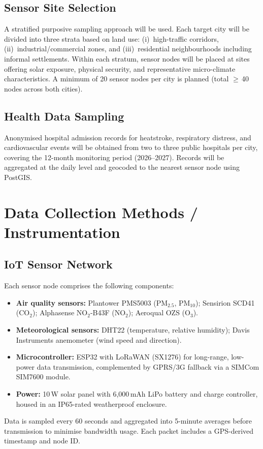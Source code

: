 \documentclass[12pt,a4paper]{report}
\begin{document}
\subsection{Sensor Site Selection}
A stratified purposive sampling approach will be used. Each target city will be divided into three strata based on land use: (i)~high-traffic corridors, (ii)~industrial/commercial zones, and (iii)~residential neighbourhoods including informal settlements. Within each stratum, sensor nodes will be placed at sites offering solar exposure, physical security, and representative micro-climate characteristics. A minimum of 20 sensor nodes per city is planned (total $\geq$\,40 nodes across both cities).

\subsection{Health Data Sampling}
Anonymised hospital admission records for heatstroke, respiratory distress, and cardiovascular events will be obtained from two to three public hospitals per city, covering the 12-month monitoring period (2026--2027). Records will be aggregated at the daily level and geocoded to the nearest sensor node using PostGIS.

\section{Data Collection Methods / Instrumentation}

\subsection{IoT Sensor Network}
Each sensor node comprises the following components:
\begin{itemize}[leftmargin=*, itemsep=4pt]
  \item \textbf{Air quality sensors:} Plantower PMS5003 (PM$_{2.5}$, PM$_{10}$); Sensirion SCD41 (CO$_2$); Alphasense NO$_2$-B43F (NO$_2$); Aeroqual OZS (O$_3$).
  \item \textbf{Meteorological sensors:} DHT22 (temperature, relative humidity); Davis Instruments anemometer (wind speed and direction).
  \item \textbf{Microcontroller:} ESP32 with LoRaWAN (SX1276) for long-range, low-power data transmission, complemented by GPRS/3G fallback via a SIMCom SIM7600 module.
  \item \textbf{Power:} 10\,W solar panel with 6,000\,mAh LiPo battery and charge controller, housed in an IP65-rated weatherproof enclosure.
\end{itemize}
Data is sampled every 60 seconds and aggregated into 5-minute averages before transmission to minimise bandwidth usage. Each packet includes a GPS-derived timestamp and node ID.
\end{document}
